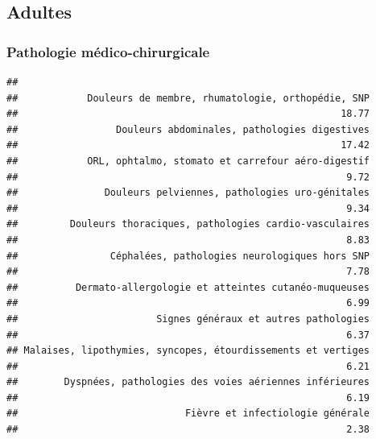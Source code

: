 \documentclass[]{article}
\newenvironment{Shaded}{\begin{snugshade}}{\end{snugshade}}
\newcommand{\KeywordTok}[1]{\textcolor[rgb]{0.13,0.29,0.53}{\textbf{{#1}}}}
\newcommand{\DataTypeTok}[1]{\textcolor[rgb]{0.13,0.29,0.53}{{#1}}}
\newcommand{\DecValTok}[1]{\textcolor[rgb]{0.00,0.00,0.81}{{#1}}}
\newcommand{\StringTok}[1]{\textcolor[rgb]{0.31,0.60,0.02}{{#1}}}
\newcommand{\OtherTok}[1]{\textcolor[rgb]{0.56,0.35,0.01}{{#1}}}
\newcommand{\NormalTok}[1]{{#1}}
\begin{document}
\subsection{Adultes}\label{adultes}

\subsubsection{Pathologie
médico-chirurgicale}\label{pathologie-medico-chirurgicale}

\begin{Shaded}
\end{Shaded}

\begin{verbatim}
## 
##            Douleurs de membre, rhumatologie, orthopédie, SNP 
##                                                        18.77 
##                 Douleurs abdominales, pathologies digestives 
##                                                        17.42 
##            ORL, ophtalmo, stomato et carrefour aéro-digestif 
##                                                         9.72 
##               Douleurs pelviennes, pathologies uro-génitales 
##                                                         9.34 
##         Douleurs thoraciques, pathologies cardio-vasculaires 
##                                                         8.83 
##                Céphalées, pathologies neurologiques hors SNP 
##                                                         7.78 
##          Dermato-allergologie et atteintes cutanéo-muqueuses 
##                                                         6.99 
##                        Signes généraux et autres pathologies 
##                                                         6.37 
## Malaises, lipothymies, syncopes, étourdissements et vertiges 
##                                                         6.21 
##        Dyspnées, pathologies des voies aériennes inférieures 
##                                                         6.19 
##                             Fièvre et infectiologie générale 
##                                                         2.38
\end{verbatim}
\end{document}
